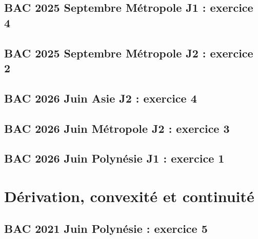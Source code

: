 \documentclass[lang=fr,edition=teacher,layout=sheet]{mxbook}
\begin{document}
\par\bigskip
{}\subsection*{BAC 2025 Septembre Métropole J1 : exercice 4}
\begingroup\endgroup
\par\bigskip
{}\subsection*{BAC 2025 Septembre Métropole J2 : exercice 2}
\begingroup\endgroup
\par\bigskip
{}\subsection*{BAC 2026 Juin Asie J2 : exercice 4}
\begingroup\endgroup
\par\bigskip
{}\subsection*{BAC 2026 Juin Métropole J2 : exercice 3}
\begingroup\endgroup
\par\bigskip
{}\subsection*{BAC 2026 Juin Polynésie J1 : exercice 1}
\begingroup\endgroup
\par\bigskip
\clearpage\section*{Dérivation, convexité et continuité}
\subsection*{BAC 2021 Juin Polynésie : exercice 5}
\begingroup\endgroup
\par\bigskip
\end{document}
